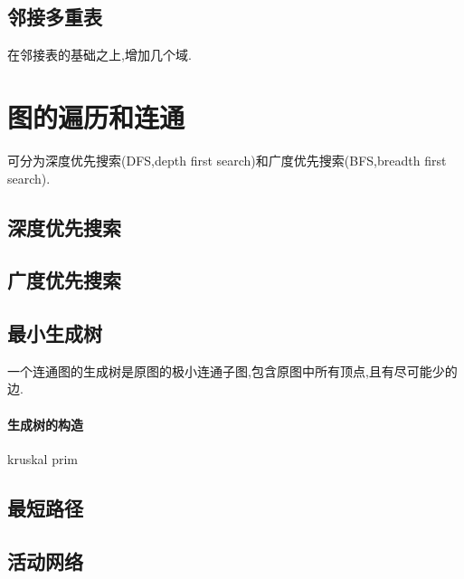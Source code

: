 \documentclass{ctexart}
\begin{document}
\subsection{邻接多重表}
在邻接表的基础之上,增加几个域.
\newpage
\section{图的遍历和连通}
可分为深度优先搜索(DFS,depth first search)和广度优先搜索(BFS,breadth first search).
\subsection{深度优先搜索}
\subsection{广度优先搜索}
\subsection{最小生成树}
一个连通图的生成树是原图的极小连通子图,包含原图中所有顶点,且有尽可能少的边.
\paragraph{生成树的构造}
kruskal prim
\subsection{最短路径}
\subsection{活动网络}





	
\end{document}
